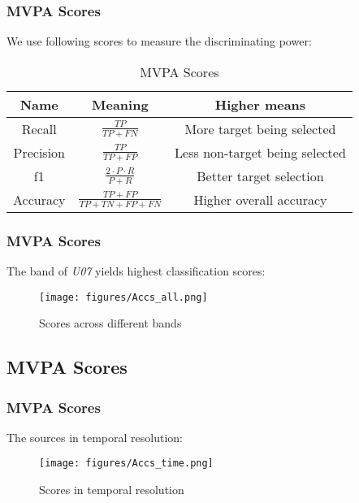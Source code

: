 \documentclass[aspectratio=169]{beamer}
\begin{document}
\begin{frame}
    \frametitle{MVPA Scores}
    We use following scores to measure the discriminating power:

    \begin{table}
        \renewcommand{\arraystretch}{1.5}
        \caption{MVPA Scores}

        \begin{tabular}{|c|c|c|}
            \hline
            \textbf{Name} & \textbf{Meaning}                       & \textbf{Higher means}          \\
            \hline
            \hline
            Recall        & $ \frac{TP}{TP+FN} $                   & More target being selected     \\
            \hline
            Precision     & $ \frac{TP}{TP+FP} $                   & Less non-target being selected \\
            \hline
            f1            & $ \frac{2 \cdot P \cdot R}{\ P+R \ } $ & Better target selection        \\
            \hline
            Accuracy      & $ \frac{TP+FP}{TP+TN+FP+FN} $          & Higher overall accuracy        \\
            \hline
        \end{tabular}

    \end{table}

\end{frame}

\begin{frame}
    \frametitle{MVPA Scores}
    The band of \emph{U07} yields highest classification scores:

    \begin{figure}[h]
        \centering
        \texttt{[image: figures/Accs\_all.png]}
        \caption{Scores across different bands}
    \end{figure}

\end{frame}

\subsection{MVPA Scores}

\begin{frame}
    \frametitle{MVPA Scores}
    The sources in temporal resolution:

    \begin{figure}[h]
        \centering
        \texttt{[image: figures/Accs\_time.png]}
        \caption{Scores in temporal resolution}
    \end{figure}

\end{frame}
\end{document}
